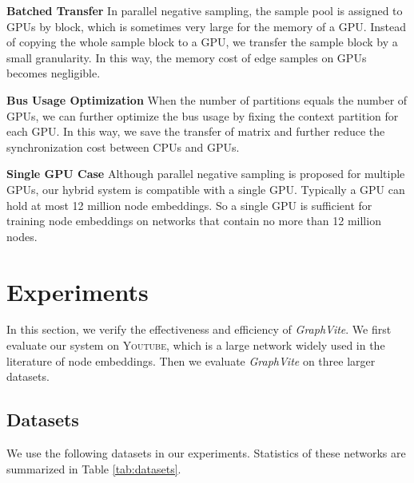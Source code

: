 \documentclass[sigconf]{acmart}
\newcommand{\dataset}[1]{\textsc{#1}\xspace}
\newcommand{\Graphy}{\textit{GraphVite}\xspace}
\begin{document}
\smallskip \noindent \textbf{Batched Transfer} In parallel negative sampling, the sample pool is assigned to GPUs by block, which is sometimes very large for the memory of a GPU. Instead of copying the whole sample block to a GPU, we transfer the sample block by a small granularity. In this way, the memory cost of edge samples on GPUs becomes negligible.

\smallskip \noindent \textbf{Bus Usage Optimization} When the number of partitions equals the number of GPUs, we can further optimize the bus usage by fixing the context partition for each GPU. In this way, we save the transfer of  matrix and further reduce the synchronization cost between CPUs and GPUs.

\smallskip \noindent \textbf{Single GPU Case} Although parallel negative sampling is proposed for multiple GPUs, our hybrid system is compatible with a single GPU. Typically a GPU can hold at most 12 million node embeddings. So a single GPU is sufficient for training node embeddings on networks that contain no more than 12 million nodes. \section{Experiments}
\label{sec:experiment}

In this section, we verify the effectiveness and efficiency of \Graphy. We first evaluate our system on \dataset{Youtube}, which is a large network widely used in the literature of node embeddings. Then we evaluate \Graphy on three larger datasets.

\subsection{Datasets}

We use the following datasets in our experiments. Statistics of these networks are summarized in Table \ref{tab:datasets}.
\end{document}
